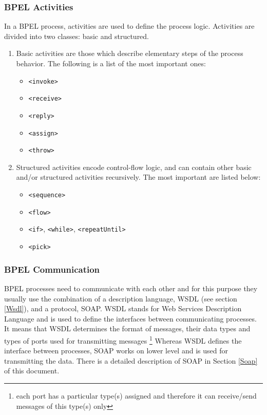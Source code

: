 \subsubsection{BPEL Activities} 
\label{BPELActivities}

In a BPEL process, activities are used to define the process logic. Activities are divided into two classes: basic and structured. 

\begin{enumerate}
\item Basic activities are those which describe elementary steps of the process behavior. The following is a list of the most important ones:
	\begin{itemize}
	\item \verb|<invoke>|
	\item \verb|<receive>|
	\item \verb|<reply>|
	\item \verb|<assign>|
	\item \verb|<throw>|
	\end{itemize}

\item Structured activities encode control-flow logic, and can contain other basic and/or structured activities recursively. The most important are listed below:
	\begin{itemize}
	\item \verb|<sequence>|
	\item \verb|<flow>|
	\item \verb|<if>|, \verb|<while>|, \verb|<repeatUntil>|  
	\item \verb|<pick>|
  \end{itemize}
\end{enumerate}


\subsubsection{BPEL Communication}
\label{BPELCommunication}
BPEL processes need to communicate with each other and for this purpose they usually use the combination of a description language, WSDL (see section \ref{Wsdl}), and a protocol, SOAP. WSDL stands for Web Services Description Language and is used to define the interfaces between communicating processes. It means that WSDL determines the format of messages, their data types and types of ports used for transmitting messages \footnote{each port has a particular type(s) assigned and therefore it can receive/send messages of this type(s) only} Whereas WSDL defines the interface between processes, SOAP works on lower level and is used for transmitting the data. There is a detailed description of SOAP in Section \ref{Soap} of this document.

